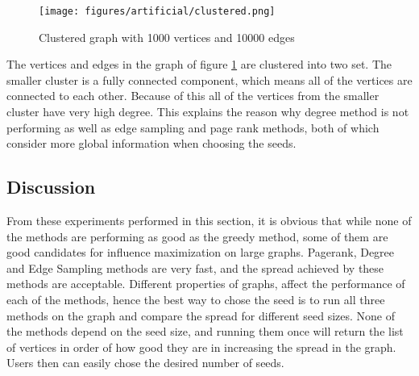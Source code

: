 \documentclass[english]{tktltiki}
\begin{document}
\begin{figure}[ht!]
\centering
\texttt{[image: figures/artificial/clustered.png]}
\caption{Clustered graph with 1000 vertices and 10000 edges}
\label{art:clustered}
\end{figure}

The vertices and edges in the graph of figure \ref{art:clustered} are clustered into two set. The smaller cluster is a fully connected component, which means all of the vertices are connected to each other. Because of this all of the vertices from the smaller cluster have very high degree. This explains the reason why degree method is not performing as well as edge sampling and page rank methods, both of which consider more global information when choosing the seeds.\\
\subsection{Discussion}
From these experiments performed in this section, it is obvious that while none of the methods are performing as good as the greedy method, some of them are good candidates for influence maximization on large graphs. Pagerank, Degree and Edge Sampling methods are very fast, and the spread achieved by these methods are acceptable. Different properties of graphs, affect the performance of each of the methods, hence the best way to chose the seed is to run all three methods on the graph and compare the spread for different seed sizes. None of the methods depend on the seed size, and running them once will return the list of vertices in order of how good they are in increasing the spread in the graph. Users then can easily chose the desired number of seeds.

\pagebreak
\end{document}
